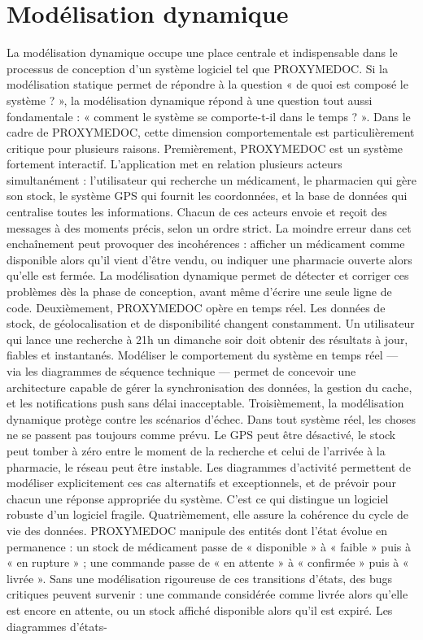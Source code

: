 \documentclass[12pt,a4paper]{report}
\begin{document}
    \section{Modélisation dynamique}
    La modélisation dynamique occupe une place centrale et indispensable dans le  processus de conception d'un système logiciel tel que PROXYMEDOC. Si la  modélisation statique permet de répondre à la question « de quoi est composé le  système ? », la modélisation dynamique répond à une question tout aussi  fondamentale : « comment le système se comporte-t-il dans le temps ? ». 
Dans le cadre de PROXYMEDOC, cette dimension comportementale est  particulièrement critique pour plusieurs raisons. 
Premièrement, PROXYMEDOC est un système fortement interactif. L'application  met en relation plusieurs acteurs simultanément : l'utilisateur qui recherche un  médicament, le pharmacien qui gère son stock, le système GPS qui fournit les  coordonnées, et la base de données qui centralise toutes les informations. Chacun  de ces acteurs envoie et reçoit des messages à des moments précis, selon un ordre  strict. La moindre erreur dans cet enchaînement peut provoquer des incohérences :  afficher un médicament comme disponible alors qu'il vient d'être vendu, ou indiquer  une pharmacie ouverte alors qu'elle est fermée. La modélisation dynamique permet  de détecter et corriger ces problèmes dès la phase de conception, avant même  d'écrire une seule ligne de code. 
Deuxièmement, PROXYMEDOC opère en temps réel. Les données de stock, de  géolocalisation et de disponibilité changent constamment. Un utilisateur qui lance  une recherche à 21h un dimanche soir doit obtenir des résultats à jour, fiables et  instantanés. Modéliser le comportement du système en temps réel — via les  diagrammes de séquence technique — permet de concevoir une architecture  capable de gérer la synchronisation des données, la gestion du cache, et les  notifications push sans délai inacceptable. 
Troisièmement, la modélisation dynamique protège contre les scénarios  d'échec. Dans tout système réel, les choses ne se passent pas toujours comme  prévu. Le GPS peut être désactivé, le stock peut tomber à zéro entre le moment de  la recherche et celui de l'arrivée à la pharmacie, le réseau peut être instable. Les  diagrammes d'activité permettent de modéliser explicitement ces cas alternatifs et  exceptionnels, et de prévoir pour chacun une réponse appropriée du système. C'est  ce qui distingue un logiciel robuste d'un logiciel fragile. 
Quatrièmement, elle assure la cohérence du cycle de vie des données. PROXYMEDOC manipule des entités dont l'état évolue en permanence : un stock de  médicament passe de « disponible » à « faible » puis à « en rupture » ; une  commande passe de « en attente » à « confirmée » puis à « livrée ». Sans une  modélisation rigoureuse de ces transitions d'états, des bugs critiques peuvent  survenir : une commande considérée comme livrée alors qu'elle est encore en  attente, ou un stock affiché disponible alors qu'il est expiré. Les diagrammes d'états-
\end{document}

